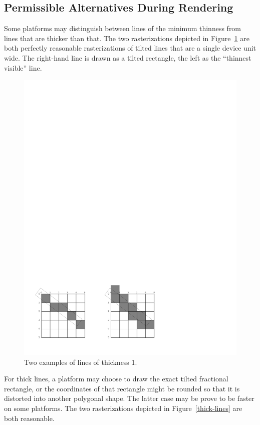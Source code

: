\subsection {Permissible Alternatives During Rendering}

Some platforms may distinguish between lines of the minimum thinness from lines
that are thicker than that.  The two rasterizations depicted in
Figure~\ref{thin-lines} are both perfectly reasonable rasterizations of tilted
lines that are a single device unit wide.  The right-hand line is drawn as a
tilted rectangle, the left as the ``thinnest visible'' line.

\begin{figure}
\centerline{\includegraphics{thin-lines}}
\caption{\label{thin-lines} Two examples of lines of thickness 1.}
\end{figure}

For thick lines, a platform may choose to draw the exact tilted fractional
rectangle, or the coordinates of that rectangle might be rounded so that it is
distorted into another polygonal shape.  The latter case may be prove to be
faster on some platforms.  The two rasterizations depicted in
Figure~\ref{thick-lines} are both reasonable.

